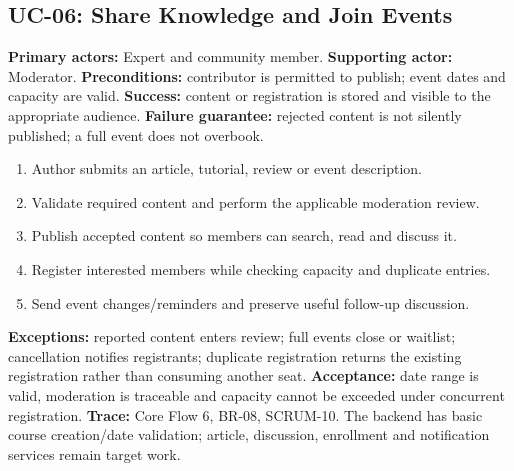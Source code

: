 \subsection{UC-06: Share Knowledge and Join Events}
\textbf{Primary actors:} Expert and community member. \textbf{Supporting actor:}
Moderator. \textbf{Preconditions:} contributor is permitted to publish; event
dates and capacity are valid. \textbf{Success:} content or registration is stored
and visible to the appropriate audience. \textbf{Failure guarantee:} rejected
content is not silently published; a full event does not overbook.
\begin{enumerate}
\item Author submits an article, tutorial, review or event description.
\item Validate required content and perform the applicable moderation review.
\item Publish accepted content so members can search, read and discuss it.
\item Register interested members while checking capacity and duplicate entries.
\item Send event changes/reminders and preserve useful follow-up discussion.
\end{enumerate}
\textbf{Exceptions:} reported content enters review; full events close or waitlist;
cancellation notifies registrants; duplicate registration returns the existing
registration rather than consuming another seat.
\textbf{Acceptance:} date range is valid, moderation is traceable and capacity
cannot be exceeded under concurrent registration.
\textbf{Trace:} Core Flow 6, BR-08, SCRUM-10. The backend has basic course
creation/date validation; article, discussion, enrollment and notification
services remain target work.

